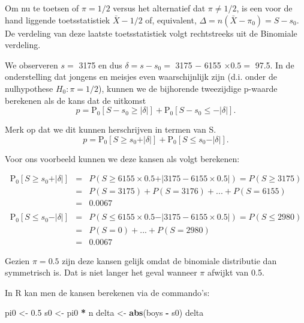\documentclass[12pt,dutch,coursenotes]{book}
\newenvironment{Shaded}{\begin{snugshade}}{\end{snugshade}}
\newcommand{\KeywordTok}[1]{\textcolor[rgb]{0.13,0.29,0.53}{\textbf{#1}}}
\newcommand{\FloatTok}[1]{\textcolor[rgb]{0.00,0.00,0.81}{#1}}
\newcommand{\StringTok}[1]{\textcolor[rgb]{0.31,0.60,0.02}{#1}}
\newcommand{\OperatorTok}[1]{\textcolor[rgb]{0.81,0.36,0.00}{\textbf{#1}}}
\newcommand{\NormalTok}[1]{#1}
\theoremstyle{definition}
\theoremstyle{definition}
\theoremstyle{definition}
\theoremstyle{remark}
\begin{document}
Om nu te toetsen of \(\pi=1/2\) versus het alternatief dat
\(\pi\neq 1/2\), is een voor de hand liggende toetsstatistiek
\(\bar X-1/2\) of, equivalent, \(\Delta=n(\bar X-\pi_0)=S-s_0\). De
verdeling van deze laatste toetsstatistiek volgt rechtstreeks uit de
Binomiale verdeling.

We observeren \(s=\) 3175 en dus \(\delta=s-s_0=\) 3175 \(-\) 6155
\(\times 0.5=\) 97.5. In de onderstelling dat jongens en meisjes even
waarschijnlijk zijn (d.i. onder de nulhypothese \(H_0:\pi=1/2\)), kunnen
we de bijhorende tweezijdige p-waarde berekenen als de kans dat de
uitkomst
\[p=\text{P}_0\left[S-s_0\geq \vert \delta\vert \right] + \text{P}_0\left[S-s_0\leq - \vert \delta\vert \right].\]

Merk op dat we dit kunnen herschrijven in termen van S.
\[p=\text{P}_0\left[S\geq s_0+ \vert \delta\vert \right] + \text{P}_0\left[S \leq s_0 - \vert \delta\vert \right].\]

Voor ons voorbeeld kunnen we deze kansen als volgt berekenen:

\begin{eqnarray*}
\text{P}_0\left[S\geq s_0+ \vert \delta\vert \right] &=& P(S \geq 6155 \times 0.5 + \vert 3175 - 6155 \times 0.5\vert ) = P(S \geq 3175)\\ 
&= &P(S= 3175) + P(S=3176) + ... + P(S=6155)\\
& =& 0.0067\\\\
\text{P}_0\left[S \leq s_0 - \vert \delta\vert \right] &=& P(S \leq  6155 \times 0.5 - \vert 3175- 6155 \times 0.5\vert) = P(S \leq 2980)\\ &= &P(S=0) + ... + P(S=2980) \\
&=&0.0067
\end{eqnarray*}

Gezien \(\pi=0.5\) zijn deze kansen gelijk omdat de binomiale
distributie dan symmetrisch is. Dat is niet langer het geval wanneer
\(\pi\) afwijkt van 0.5.

In R kan men de kansen berekenen via de commando's:

\begin{Shaded}
\begin{Highlighting}[]
\NormalTok{pi0 <-}\StringTok{ }\FloatTok{0.5}
\NormalTok{s0 <-}\StringTok{ }\NormalTok{pi0 }\OperatorTok{*}\StringTok{ }\NormalTok{n}
\NormalTok{delta <-}\StringTok{ }\KeywordTok{abs}\NormalTok{(boys }\OperatorTok{-}\StringTok{ }\NormalTok{s0)}
\NormalTok{delta}
\end{Highlighting}
\end{Shaded}
\end{document}

